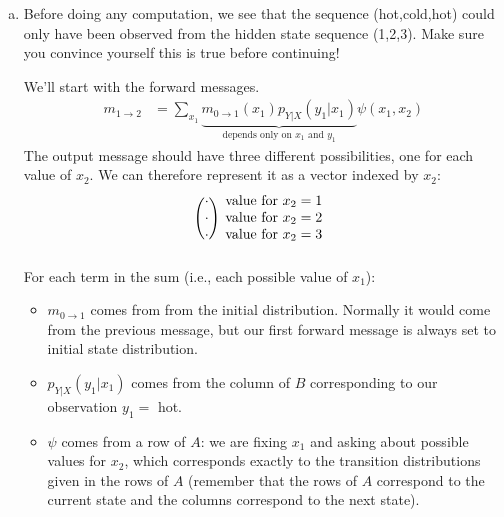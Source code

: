 \documentclass[12pt]{article}
\begin{document}
{\begin{enumerate}[(a)]
        \item Before doing any computation, we see that the sequence (hot,cold,hot) could only
            have been observed from the hidden state sequence (1,2,3). Make sure you convince
            yourself this is true before continuing!

            We'll start with the forward messages.
            \begin{align*}
                m_{1 \to 2} &= \sum_{x_1} \underbrace{m_{0 \to 1}(x_1) p_{Y|X}(y_1|x_1)}_{\text{depends only on $x_1$ and $y_1$}} \psi(x_1,x_2)
            \end{align*}
            The output message should have three different possibilities, one for each value of $x_2$.
            We can therefore represent it as a vector indexed by $x_2$:
            \begin{align*}
                \begin{blockarray}{cc}
                    \begin{block}{(c)c}
                        \cdot & \text{value for $x_2 = 1$} \\
                        \cdot & \text{value for $x_2 = 2$} \\
                        \cdot & \text{value for $x_2 = 3$} \\
                    \end{block}
                \end{blockarray}
            \end{align*}
            For each term in the sum (i.e., each possible value of $x_1$):
            \begin{itemize}
                \item $m_{0 \to 1}$ comes from from the initial distribution. Normally it would come from
                    the previous message, but our first forward message is always set to
                    initial state distribution.
                \item $p_{Y|X}(y_1|x_1)$ comes from the column of $B$ corresponding
                    to our observation $y_1 = $ hot.
                \item $\psi$ comes from a row of $A$: we are fixing $x_1$ and
                    asking about possible values for $x_2$, which corresponds
                    exactly to the transition distributions given in the rows
                    of $A$ (remember that the rows of $A$ correspond to the
                    current state and the columns correspond to the next
                    state).

\end{itemize}
\end{enumerate}}
\end{document}
